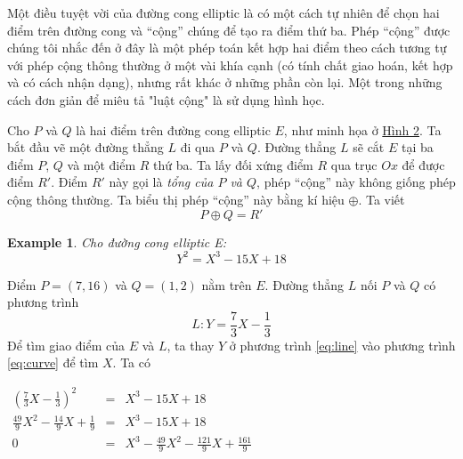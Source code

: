 \documentclass[12pt]{article}
\newtheorem{example}{Example}
\begin{document}
Một điều tuyệt vời của đường cong elliptic là có một cách tự nhiên để chọn hai điểm trên đường cong và
``cộng'' chúng để tạo ra điểm thứ ba. Phép ``cộng'' được chúng tôi nhắc đến ở đây là một phép toán kết hợp hai điểm theo cách tương tự với phép cộng thông thường
ở một vài khía cạnh (có tính chất giao hoán, kết hợp và có cách nhận dạng), nhưng rất khác ở những phần còn lại. Một trong những cách đơn giản để miêu tả "luật cộng" là sử dụng hình học.

Cho $P$ và $Q$ là hai điểm trên đường cong elliptic $E$, như minh họa ở \hyperref[fg:fg2]{Hình 2}. Ta bắt đầu vẽ một đường thẳng $L$ đi qua $P$ và $Q$. Đường thẳng
$L$ sẽ cắt $E$ tại ba điểm $P$, $Q$ và một điểm $R$ thứ ba. Ta lấy đối xứng điểm $R$ qua trục $Ox$ để được điểm $R'$. Điểm $R'$ này gọi là \textit{tổng của $P$ và $Q$},
phép ``cộng'' này không giống phép cộng thông thường. Ta biểu thị phép ``cộng'' này bằng kí hiệu $\oplus$. Ta viết
\begin{equation}
    P \oplus Q = R'
\end{equation}

\begin{example}
    \label{ex:ex1}
    Cho đường cong elliptic E:
    \begin{equation}
        \label{eq:curve}
        Y^2 = X^3 -15X + 18
    \end{equation}
\end{example}
Điểm $P = (7,16)$ và $Q = (1,2)$ nằm trên $E$. Đường thẳng $L$ nối $P$ và $Q$ có phương trình
\begin{equation}
    \label{eq:line}
    L: Y = \frac{7}{3}X - \frac{1}{3}
\end{equation}
Để tìm giao điểm của $E$ và $L$, ta thay $Y$ ở phương trình \eqref{eq:line} vào phương trình \eqref{eq:curve} để tìm $X$. Ta có
\begin{center}

    $
        \begin{array}{rcl}
            (\frac{7}{3}X - \frac{1}{3})^2                & = & X^3 -15X+18                                        \\
            \frac{49}{9}X^2 - \frac{14}{9}X + \frac{1}{9} & = & X^3 -15X+18                                        \\
            0                                             & = & X^3 -\frac{49}{9}X^2 -\frac{121}{9}X+\frac{161}{9} \\
        \end{array}
    $
\end{center}
\end{document}
